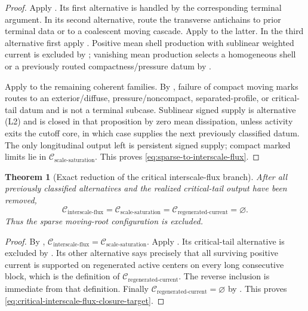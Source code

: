 \documentclass[11pt]{amsart}
\numberwithin{equation}{section}
\theoremstyle{plain}
\newtheorem{theorem}{Theorem}[section]
\theoremstyle{definition}
\theoremstyle{remark}
\newcommand{\Cisf}{\mathcal C_{\mathrm{interscale\text{-}flux}}}
\newcommand{\Csat}{\mathcal C_{\mathrm{scale\text{-}saturation}}}
\newcommand{\Cregen}{\mathcal C_{\mathrm{regenerated\text{-}current}}}
\begin{document}
\begin{proof}
Apply .  Its first alternative
is handled by the corresponding terminal argument.  In its second alternative,
route the transverse antichains to prior terminal data or to a coalescent
moving cascade.  Apply  to the
latter.  In the third alternative first apply
.  Positive mean shell production
with sublinear weighted current is excluded by
; vanishing mean production
selects a homogeneous shell or a previously routed compactness/pressure datum
by .

Apply  to the remaining coherent
families.  By , failure of compact moving
marks routes to an exterior/diffuse, pressure/noncompact, separated-profile,
or critical-tail datum and is not a terminal subcase.  Sublinear signed supply
is alternative \textup{(L2)} and is
closed in that proposition by zero mean dissipation, unless activity exits the
cutoff core, in which case
 supplies the next previously
classified datum.  The only longitudinal output left is persistent signed
supply; compact marked limits lie in \(\Csat\).  This
proves \eqref{eq:sparse-to-interscale-flux}.
\end{proof}

\begin{theorem}[Exact reduction of the critical interscale-flux branch]
\label{thm:critical-interscale-flux-exclusion}
After all previously classified alternatives and the realized critical-tail
output have been removed,
\begin{equation}\label{eq:critical-interscale-flux-closure-target}
 \Cisf=\Csat=\Cregen=\varnothing .
\end{equation}
Thus the sparse moving-root configuration is excluded.
\end{theorem}

\begin{proof}
By , \(\Cisf=\Csat\).  Apply
.  Its critical-tail alternative
is excluded by .  Its other
alternative says precisely that all surviving positive current is supported
on regenerated active centers on every long consecutive block, which is the
definition of \(\Cregen\).  The reverse inclusion is immediate from that
definition.  Finally \(\Cregen=\varnothing\) by
.  This proves
\eqref{eq:critical-interscale-flux-closure-target}.
\end{proof}
\end{document}
